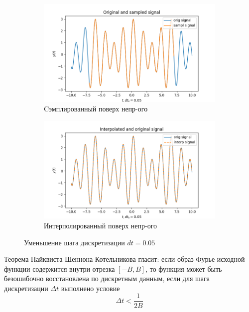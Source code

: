 \documentclass[a4paper, 12pt]{article}
\begin{document}
    \begin{figure}[H]
        \centering
        \begin{subfigure}{0.45\textwidth}
            \centering
            \includegraphics[width=\linewidth]{3_sine.png}
            \caption{Cэмплированный поверх непр-ого}
            \label{fig:3sine}
        \end{subfigure}
        \hspace{5mm}
        \begin{subfigure}{0.45\textwidth}
            \centering
            \includegraphics[width=\linewidth]{3_isine.png}
            \caption{Интерполированный поверх непр-ого}
            \label{fig:3isine}
        \end{subfigure}
        \caption{Уменьшение шага дискретизации $dt=0.05$}
        \label{fig:sines3}
    \end{figure}


    Теорема Найквиста-Шеннона-Котельникова гласит: если образ Фурье исходной функции содержится
    внутри отрезка $[-B, B]$, то функция может быть безошибочно восстановлена по дискретным данным,
    если для шага дискретизации $\Delta t$ выполнено условие $$\Delta t < \dfrac{1}{2B}$$
\end{document}

